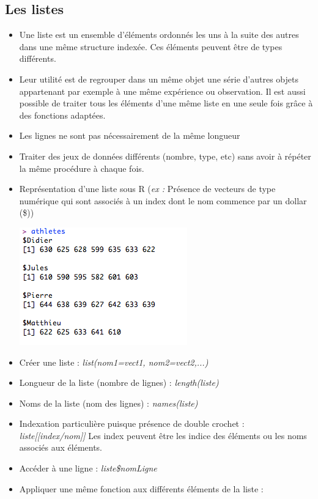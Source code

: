 \documentclass[12pt,a4paper]{article}
\begin{document}
\subsection{Les listes}
\begin{itemize}
\item Une liste est un ensemble d'éléments ordonnés les uns à la suite des autres dans une même structure indexée. Ces éléments peuvent être de types différents.
\item Leur utilité est de regrouper dans un même objet une série d'autres objets appartenant par exemple à une même expérience ou observation. Il est aussi possible de traiter tous les éléments d'une même liste en une seule fois grâce à des fonctions adaptées.
\item Les lignes ne sont pas nécessairement de la même longueur
\item Traiter des jeux de données différents (nombre, type, etc) sans avoir à répéter la même procédure à chaque fois.
\item Représentation d'une liste sous R (\textit{ex : }Présence de vecteurs de type numérique qui sont associés à un index dont le nom commence par un dollar (\$))
\begin{flushleft}
\includegraphics[scale=0.5]{liste}
\end{flushleft}
\item Créer une liste : \textit{list(nom1=vect1, nom2=vect2,...)}
\item Longueur de la liste (nombre de lignes) : \textit{length(liste)}
\item Noms de la liste (nom des lignes) : \textit{names(liste)}
\item Indexation particulière puisque présence de double crochet : \textit{liste[[index/nom]]}
\newline Les index peuvent être les indice des éléments ou les noms associés aux éléments. 
\item Accéder à une ligne : \textit{liste\$nomLigne}
\item Appliquer une même fonction aux différents éléments de la liste : 

\end{itemize}
\end{document}
